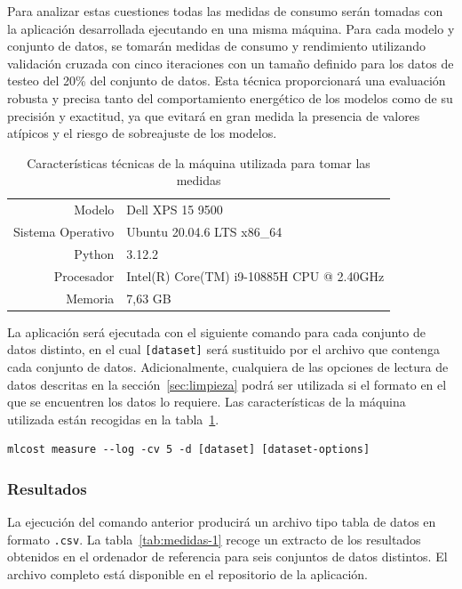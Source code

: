 Para analizar estas cuestiones todas las medidas de consumo serán tomadas con la aplicación desarrollada ejecutando en una misma máquina. Para cada modelo y conjunto de datos, se tomarán medidas de consumo y rendimiento utilizando validación cruzada con cinco iteraciones con un tamaño definido para los datos de testeo del 20\% del conjunto de datos. Esta técnica proporcionará una evaluación robusta y precisa tanto del comportamiento energético de los modelos como de su precisión y exactitud, ya que evitará en gran medida la presencia de valores atípicos y el riesgo de sobreajuste de los modelos.

\begin{table}[h]
    \centering
    \begin{tabular}{rl}
         Modelo & Dell XPS 15 9500\\
         Sistema Operativo & Ubuntu 20.04.6 LTS x86\_64\\
         Python & 3.12.2\\
         Procesador & Intel(R) Core(TM) i9-10885H CPU @ 2.40GHz\\
         Memoria & 7,63 GB\\
    \end{tabular}
    \caption{Características técnicas de la máquina utilizada para tomar las medidas}
    \label{tab:caracteristicas-tecnicas}
\end{table}

La aplicación será ejecutada con el siguiente comando para cada conjunto de datos distinto, en el cual \texttt{[dataset]} será sustituido por el archivo que contenga cada conjunto de datos. Adicionalmente, cualquiera de las opciones de lectura de datos descritas en la sección~\ref{sec:limpieza} podrá ser utilizada si el formato en el que se encuentren los datos lo requiere. Las características de la máquina utilizada están recogidas en la tabla~\ref{tab:caracteristicas-tecnicas}.
\begin{verbatim}
mlcost measure --log -cv 5 -d [dataset] [dataset-options]
\end{verbatim}

\subsubsection{Resultados}

La ejecución del comando anterior producirá un archivo tipo tabla de datos en formato \texttt{.csv}. La tabla~\ref{tab:medidas-1} recoge un extracto de los resultados obtenidos en el ordenador de referencia para seis conjuntos de datos distintos. El archivo completo está disponible en el repositorio de la aplicación.

